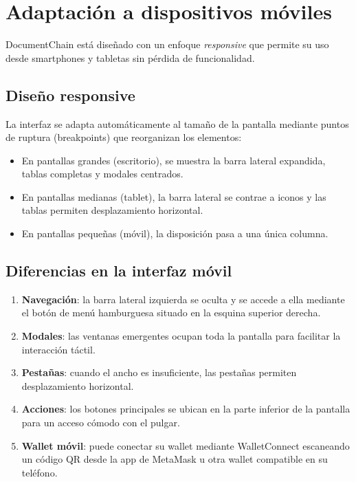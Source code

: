 \documentclass[11pt, a4paper]{article}
\begin{document}
\section{Adaptaci\'{o}n a dispositivos m\'{o}viles}

DocumentChain est\'{a} dise\~{n}ado con un enfoque \textit{responsive} que permite su uso desde smartphones y tabletas sin p\'{e}rdida de funcionalidad.

\subsection{Dise\~{n}o responsive}

La interfaz se adapta autom\'{a}ticamente al tama\~{n}o de la pantalla mediante puntos de ruptura (breakpoints) que reorganizan los elementos:

\begin{itemize}
    \item En pantallas grandes (escritorio), se muestra la barra lateral expandida, tablas completas y modales centrados.
    \item En pantallas medianas (tablet), la barra lateral se contrae a iconos y las tablas permiten desplazamiento horizontal.
    \item En pantallas peque\~{n}as (m\'{o}vil), la disposici\'{o}n pasa a una \'{u}nica columna.
\end{itemize}

\subsection{Diferencias en la interfaz m\'{o}vil}

\begin{enumerate}
    \item \textbf{Navegaci\'{o}n}: la barra lateral izquierda se oculta y se accede a ella mediante el bot\'{o}n de men\'{u} hamburguesa situado en la esquina superior derecha.
    \item \textbf{Modales}: las ventanas emergentes ocupan toda la pantalla para facilitar la interacci\'{o}n t\'{a}ctil.
    \item \textbf{Pesta\~{n}as}: cuando el ancho es insuficiente, las pesta\~{n}as permiten desplazamiento horizontal.
    \item \textbf{Acciones}: los botones principales se ubican en la parte inferior de la pantalla para un acceso c\'{o}modo con el pulgar.
    \item \textbf{Wallet m\'{o}vil}: puede conectar su wallet mediante WalletConnect escaneando un c\'{o}digo QR desde la app de MetaMask u otra wallet compatible en su tel\'{e}fono.
\end{enumerate}
\end{document}
